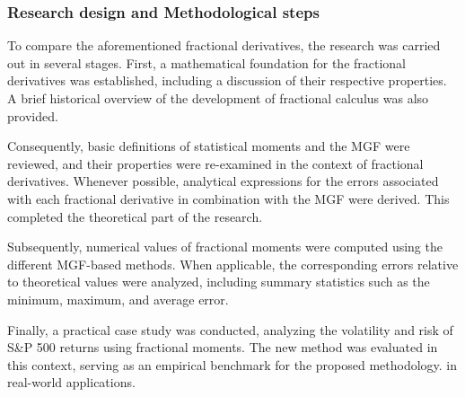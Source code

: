 \subsubsection{Research design and Methodological steps}
To compare the aforementioned fractional derivatives, the research was carried out in several stages. First, a mathematical foundation for the fractional derivatives was established, including a discussion of their respective properties. A brief historical overview of the development of fractional calculus was also provided. 

Consequently, basic definitions of statistical moments and the MGF were reviewed, and their properties were re-examined in the context of fractional derivatives. Whenever possible, analytical expressions for the errors associated with each fractional derivative in combination with the MGF were derived. This completed the theoretical part of the research.

Subsequently, numerical values of fractional moments were computed using the different MGF-based methods. When applicable, the corresponding errors relative to theoretical values were analyzed, including summary statistics such as the minimum, maximum, and average error. 

Finally, a practical case study was conducted, analyzing the volatility and risk of S\&P 500 returns using fractional moments. The new method was evaluated in this context, serving as an empirical benchmark for the proposed methodology.
in real-world applications.



